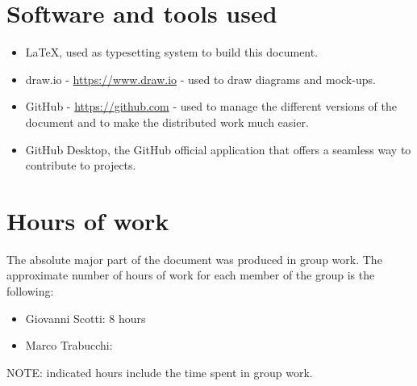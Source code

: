\section{Software and tools used}
\begin{itemize}
\item \LaTeX, used as typesetting system to build this document.
\item draw.io - \url{https://www.draw.io} - used to draw diagrams and mock-ups.
\item GitHub - \url{https://github.com} - used to manage the different versions of the document and to make the distributed work much easier.
\item GitHub Desktop, the GitHub official application that offers a seamless way to contribute to projects.
\end{itemize}
\section{Hours of work}
The absolute major part of the document was produced in group work. The approximate number of hours of work for each member of the group is the following:

\begin{itemize}
\item Giovanni Scotti: 8 hours
\item Marco Trabucchi:
\end{itemize}

NOTE: indicated hours include the time spent in group work.